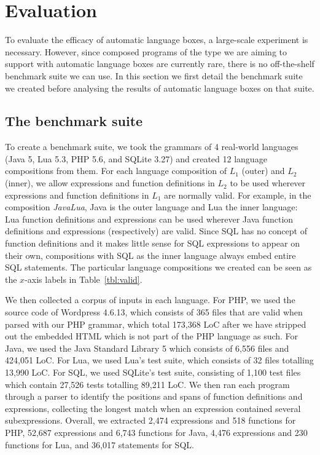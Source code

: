 \documentclass[sigplan,screen]{acmart}\settopmatter{printfolios=true,printccs=false,printacmref=false}
\begin{document}
\section{Evaluation}
\label{sec:evaluation}

To evaluate the efficacy of automatic language boxes, a large-scale experiment
is necessary. However, since composed programs of the type we are aiming to
support with automatic language boxes are currently rare, there is no
off-the-shelf benchmark suite we can use. In this section we first detail
the benchmark suite we created before analysing the results of automatic
language boxes on that suite.


\subsection{The benchmark suite}

To create a benchmark suite, we took the grammars of 4 real-world languages
(Java 5, Lua 5.3, PHP 5.6, and
SQLite 3.27) and created 12 language compositions from them.
For each language composition of $L_1$ (outer) and $L_2$ (inner), we allow
expressions and function definitions in $L_2$ to be used wherever expressions
and function definitions in $L_1$ are normally valid. For example, in the
composition \emph{JavaLua}, Java is the outer language and Lua the inner
language: Lua function definitions and expressions can be used wherever Java
function definitions and expressions (respectively) are valid. Since SQL
has no concept of function definitions and it makes little sense for SQL expressions
to appear on their own, compositions with SQL as the
inner language always embed entire SQL statements. The
particular language compositions we created can be seen as the $x$-axis labels
in Table~\ref{tbl:valid}.

We then collected a corpus of inputs in each language.
For PHP, we used the source code of Wordpress 4.6.13, which consists of 365 files that are
valid when parsed with our PHP grammar, which total 173,368 LoC after we
have stripped out the embedded HTML which is not part of the PHP
language as such. For Java, we used the Java Standard Library 5 which consists
of 6,556 files and 424,051 LoC.
For Lua, we used Lua's test suite, which consists of 32 files totalling 13,990 LoC.
For SQL, we used SQLite's test suite, consisting of 1,100 test files which
contain 27,526 tests totalling 89,211 LoC.
We then ran each program through a parser to identify the positions and spans
of function definitions and expressions, collecting the longest match when an
expression contained several subexpressions. Overall, we extracted 2,474
expressions and 518 functions for PHP, 52,687 expressions and 6,743 functions for
Java, 4,476 expressions and 230 functions for Lua, and 36,017 statements for SQL.
\end{document}

